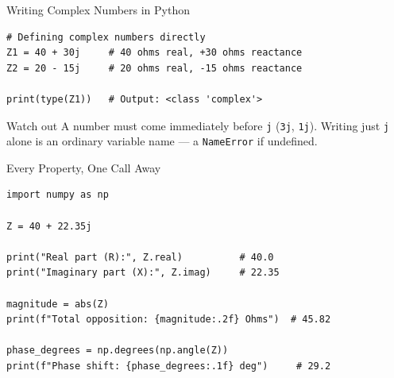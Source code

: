\documentclass[9pt,aspectratio=169,xcolor=table]{beamer}
\begin{document}
\begin{frame}[fragile]{Writing Complex Numbers in Python}
    \leavevmode
\begin{lstlisting}
# Defining complex numbers directly
Z1 = 40 + 30j     # 40 ohms real, +30 ohms reactance
Z2 = 20 - 15j     # 20 ohms real, -15 ohms reactance

print(type(Z1))   # Output: <class 'complex'>
\end{lstlisting}

    \vspace{2mm}
    \begin{alertblock}{Watch out}
        A number must come immediately before \texttt{j}
        (\texttt{3j}, \texttt{1j}). Writing just \texttt{j} alone is an
        ordinary variable name --- a \texttt{NameError} if undefined.
    \end{alertblock}
\end{frame}

\begin{frame}[fragile]{Every Property, One Call Away}
    \leavevmode
\begin{lstlisting}
import numpy as np

Z = 40 + 22.35j

print("Real part (R):", Z.real)          # 40.0
print("Imaginary part (X):", Z.imag)     # 22.35

magnitude = abs(Z)
print(f"Total opposition: {magnitude:.2f} Ohms")  # 45.82

phase_degrees = np.degrees(np.angle(Z))
print(f"Phase shift: {phase_degrees:.1f} deg")     # 29.2
\end{lstlisting}
\end{frame}
\end{document}
